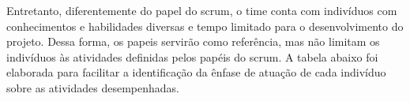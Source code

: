\documentclass[
    12pt,               %
    openright,          %
    oneside,
    a4paper,            %
    BIBLATEX,           %
    TODO,               %
    english,            %
    brazil              %
    ]{ifsp-spo-inf-ctds}
\begin{document}
            Entretanto, diferentemente do papel do scrum, o time conta com indivíduos com conhecimentos e habilidades diversas e tempo limitado para o desenvolvimento do projeto. Dessa forma, os papeis servirão como referência, mas não limitam os indivíduos às atividades definidas pelos papéis do scrum. A tabela abaixo foi elaborada para facilitar a identificação da ênfase de atuação de cada indivíduo sobre as atividades desempenhadas.
            
    
   \begin{center}
        \begin{table}[h]
        \centering
\end{table}
\end{center}
\end{document}
